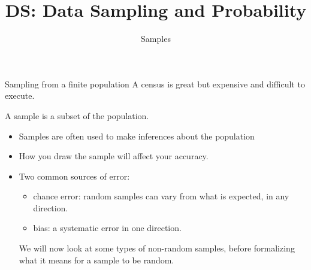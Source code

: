 \documentclass[aspectratio=169]{../latex_main/tntbeamer}  %
\title[Introduction]{DS: Data Sampling and Probability}
\subtitle{Samples}
\begin{document}
	
	\maketitle
	
	\begin{frame}{Sampling from a finite population}
	    A census is great but expensive and difficult to execute.
     
	    \bigskip
	    \alert{A sample is a subset of the population.}
        \begin{itemize}
            \item Samples are often used to make inferences about the population
            \item How you draw the sample will affect your accuracy.
            \item Two common sources of error:
            \begin{itemize}
                \item chance error: random samples can vary from what is expected, in any direction.
                \item bias: a systematic error in one direction.
            \end{itemize}
               \bigskip
               \bigskip
               We will now look at some types of non-random samples, before formalizing what it means for a sample to be random.

        \end{itemize}
	    
	\end{frame}
	
\end{document}
